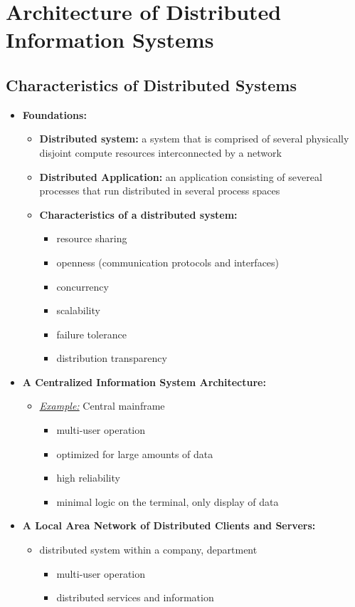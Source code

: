 \documentclass[ieeetran]{article}
\begin{document}
\pagebreak
\section{Architecture of Distributed Information Systems} %
\label{sec:architecture_of_distributed_information_systems}

\subsection{Characteristics of Distributed Systems} %
\label{sub:characteristics_of_distributed_systems}

\begin{itemize}
  \item \textbf{Foundations:}
	  \begin{itemize}

	\item \textbf{Distributed system:} a system that is comprised of several physically disjoint compute resources interconnected by a network
	    \item \textbf{Distributed Application:} an application consisting of severeal processes that run distributed in several process spaces
\item \textbf{Characteristics of a distributed system:}
	\begin{itemize}
	  \item resource sharing
	\item openness (communication protocols and interfaces)
	\item concurrency
		\item scalability
			\item failure tolerance
				\item distribution transparency
	\end{itemize}
	  \end{itemize}
\item \textbf{A Centralized Information System Architecture:}
\begin{itemize}
  \item \textit{\underline{Example:}} Central mainframe
	  \begin{itemize}
	    \item multi-user operation
	\item optimized for large amounts of data
		\item high reliability
		\item minimal logic on the terminal, only display of data
	  \end{itemize}
\end{itemize}
\item \textbf{A Local Area Network of Distributed Clients and Servers:}
	\begin{itemize}
	  \item distributed system within a company, department
		  \begin{itemize}
		    \item multi-user operation
		\item distributed services and information
		  \end{itemize}


\end{itemize}
\end{itemize}
\end{document}
